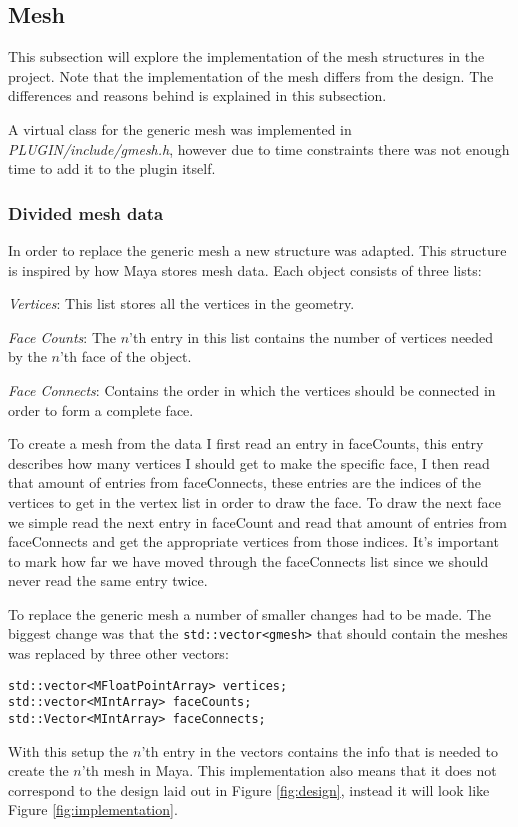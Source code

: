 \subsection{Mesh}
This subsection will explore the implementation of the mesh structures in the
project. Note that the implementation of the mesh differs from
the design. The differences and reasons behind is explained in this subsection.

A virtual class for the generic mesh was implemented in
\textit{PLUGIN/include/gmesh.h}, however due to time constraints there was not
enough time to add it to the plugin itself.

\subsubsection{Divided mesh data}
In order to replace the generic mesh a new structure was adapted. This structure
is inspired by how Maya stores mesh data. Each object consists of three lists:
\begin{enumerate*}
  \item \textit{Vertices}: This list stores all the vertices in the geometry.

  \item \textit{Face Counts}: The $n$'th entry in this list contains the number
    of vertices needed by the $n$'th face of the object.

  \item \textit{Face Connects}: Contains the order in which the vertices should
    be connected in order to form a complete face.
\end{enumerate*}

To create a mesh from the data I first read an entry in faceCounts, this entry
describes how many vertices I should get to make the specific face, I then read
that amount of entries from faceConnects, these entries are the indices of the
vertices  to get in the vertex list in order to draw the face. To draw the
next face we simple read the next entry in faceCount and read that amount of
entries from faceConnects and get the appropriate vertices from those indices.
It's important to mark how far we have moved through the faceConnects list since
we should never read the same entry twice.

To replace the generic mesh a number of smaller changes had to be made. The
biggest change was that the \texttt{std::vector<gmesh>} that should contain the
meshes was replaced by three other vectors:
\begin{lstlisting}
std::vector<MFloatPointArray> vertices;
std::vector<MIntArray> faceCounts;
std::Vector<MIntArray> faceConnects;
\end{lstlisting}
With this setup the $n$'th entry in the vectors contains the info that is needed
to create the $n$'th mesh in Maya. This implementation also means that it does
not correspond to the design laid out in Figure \ref{fig:design}, instead it
will look like Figure \ref{fig:implementation}.

